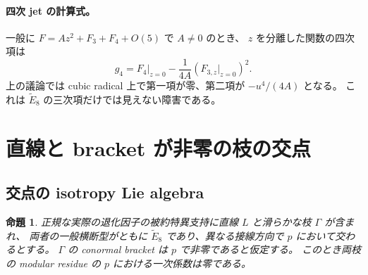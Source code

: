 \documentclass[11pt,a4paper]{ltjsarticle}
\newtheorem{proposition}[theorem]{命題}
\theoremstyle{remark}\newtheorem{remark}[theorem]{注意}
\begin{document}
\paragraph{四次 jet の計算式。}
一般に $F=Az^2+F_3+F_4+O(5)$ で $A\ne0$ のとき、
$z$ を分離した関数の四次項は
\[
 g_4=F_4|_{z=0}-\frac{1}{4A}\left(F_{3,z}|_{z=0}\right)^2.
\]
上の議論では cubic radical 上で第一項が零、第二項が $-u^4/(4A)$ となる。
これは $\widetilde E_8$ の三次項だけでは見えない障害である。


\section{直線と bracket が非零の枝の交点}
\subsection{交点の isotropy Lie algebra}

\begin{proposition}\label{prop:line-conic-slopes}
正規な実際の退化因子の被約特異支持に直線 $L$ と滑らかな枝 $\Gamma$ が含まれ、
両者の一般横断型がともに $\widetilde E_8$ であり、異なる接線方向で $p$ において交わるとする。
$\Gamma$ の conormal bracket は $p$ で非零であると仮定する。
このとき両枝の modular residue の $p$ における一次係数は零である。
\end{proposition}
\end{document}
